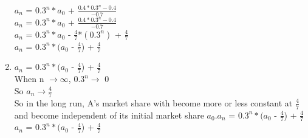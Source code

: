 \documentclass{article}
\begin{document}
\begin{enumerate}
$a_{n}$ = $0.3^{n}* a_{0}$ + $\frac{0.4*0.3^{n}-0.4}{-0.7}$\\
$a_{n}$ = $0.3^{n}* a_{0}$ + $\frac{0.4*0.3^{n}-0.4}{-0.7}$\\
$a_{n}$ = $0.3^{n}* a_{0}$ - $\frac{4}{7}$*$(0.3^{n})$ + $\frac{4}{7}$\\
$a_{n}$ = $0.3^{n}* (a_{0}$ - $\frac{4}{7}$) + $\frac{4}{7}$\\
\item %
$a_{n}$ = $0.3^{n}* (a_{0}$ - $\frac{4}{7}$) + $\frac{4}{7}$\\
When n $\rightarrow \infty$, $0.3^{n} \rightarrow$ 0 \\
So $a_{n} \rightarrow \frac{4}{7}$ \\
So in the long run, A's market share with become more or less constant at $\frac{4}{7}$ and become independent of its initial market share $a_{0}$.$a_{n}$ = $0.3^{n}* (a_{0}$ - $\frac{4}{7}$) + $\frac{4}{7}$\\$a_{n}$ = $0.3^{n}* (a_{0}$ - $\frac{4}{7}$) + $\frac{4}{7}$\\
\end{enumerate}
\end{document}
